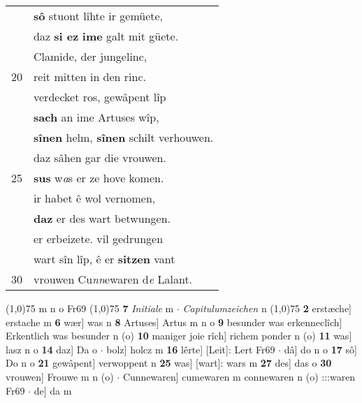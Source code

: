 \documentclass[8pt,a4paper,notitlepage]{article}
\begin{document}
\begin{table}[ht]
\begin{minipage}[t]{0.5\linewidth}
\begin{tabular}{rl}
 & \textbf{sô} stuont lîhte ir gemüete,\\ 
 & daz \textbf{si ez} \textbf{ime} galt mit güete.\\ 
 & Clamide, der jungelinc,\\ 
20 & reit mitten in den rinc.\\ 
 & verdecket ros, gewâpent lîp\\ 
 & \textbf{sach} an ime Artuses wîp,\\ 
 & \textbf{sînen} helm, \textbf{sînen} schilt verhouwen.\\ 
 & daz sâhen gar die vrouwen.\\ 
25 & \textbf{sus} w\textit{a}s er ze hove komen.\\ 
 & ir habet ê wol vernomen,\\ 
 & \textbf{daz} er des wart betwungen.\\ 
 & er erbeizete. vil gedrungen\\ 
 & wart sîn lîp, ê er \textbf{sitzen} vant\\ 
30 & vrouwen Cu\textit{nn}ewaren d\textit{e} Lalant.\\ 
\end{tabular}
\scriptsize
\line(1,0){75} \newline
m n o Fr69 \newline
\line(1,0){75} \newline
\textbf{7} \textit{Initiale} m   $\cdot$ \textit{Capitulumzeichen} n  \newline
\line(1,0){75} \newline
\textbf{2} erstæche] erstache m \textbf{6} wær] was n \textbf{8} Artuses] Artus m n o \textbf{9} besunder was erkenneclîch] Erkentlich was besunder n (o) \textbf{10} maniger joie rîch] richem ponder n (o) \textbf{11} was] lasz n o \textbf{14} daz] Da o  $\cdot$ bolz] holcz m \textbf{16} lêrte] [Leit]: Lert Fr69  $\cdot$ dâ] do n o \textbf{17} sô] Do n o \textbf{21} gewâpent] verwoppent n \textbf{25} was] [wart]: wars m \textbf{27} des] das o \textbf{30} vrouwen] Frouwe m n (o)  $\cdot$ Cunnewaren] cumewaren m connewaren n (o) :::waren Fr69  $\cdot$ de] da m \newline
\end{minipage}
\end{table}
\newpage
\end{document}
